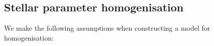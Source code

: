\documentclass[preprint]{aastex}
\begin{document}



 


\subsection{Stellar parameter homogenisation}
\label{sec:stellar-parameter-homogenisation}


\noindent{}We make the following assumptions when constructing a model for homogenisation:
\end{document}
